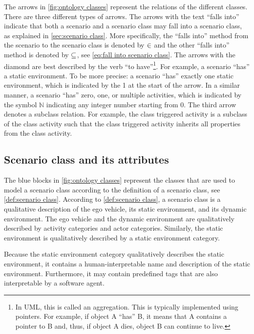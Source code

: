 The arrows in \cref{fig:ontology classes} represent the relations of the different classes. There are three different types of arrows. The arrows with the text ``falls into'' indicate that both a scenario and a scenario class may fall into a scenario class, as explained in \cref{sec:scenario class}. \cbstartc More specifically, the ``falls into'' method from the scenario to the scenario class is denoted by $\in$ and the other ``falls into'' method is denoted by $\subseteq$, see \cref{eq:fall into scenario class}. \cbend 
The arrows with the diamond are best described by the verb ``to have''\footnote{In UML, this is called an aggregation. \cbstartb This is typically implemented using pointers. For example, if object A ``has'' B, it means that A contains a pointer to B and, thus, if object A dies, object B can continue to live.\cbend}. For example, a scenario ``has'' a static environment. To be more precise: a scenario ``has'' exactly one static environment, which is indicated by the 1 at the start of the arrow. In a similar manner, a scenario ``has'' zero, one, or multiple activities, which is indicated by the symbol $\mathbb{N}$ indicating any integer number starting from 0. The third arrow denotes a subclass relation. For example, the class triggered activity is a subclass of the class activity such that the class triggered activity inherits all properties from the class activity.



\subsection{Scenario class and its attributes}
\label{sec:domain scenario class}

The blue blocks in \cref{fig:ontology classes} represent the classes that are used to model a scenario class according to the definition of a scenario class, see \cref{def:scenario class}. According to \cref{def:scenario class}, a scenario class is a qualitative description of the ego vehicle, its static environment, and its dynamic environment. The ego vehicle and the dynamic environment are qualitatively described by activity categories and actor categories. Similarly, the static environment is qualitatively described by a static environment category. 

\cbstartc
Because the static environment category qualitatively describes the static environment, it contains a human-interpretable name and description of the static environment. Furthermore, it may contain predefined tags that are also interpretable by a software agent.
\cbend

